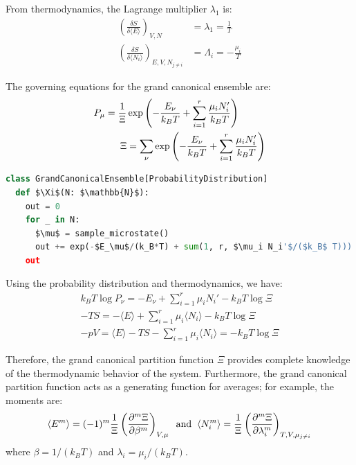 \documentclass[book.tex]{subfiles}
\begin{document}
From thermodynamics, the Lagrange multiplier $\lambda_1$ is:
\begin{align}
\left( \frac{\delta S}{\delta \langle E \rangle} \right)_{V,N} &= \lambda_1 = \frac{1}{T} \\ 
\left( \frac{\delta S}{\delta \langle N_i \rangle} \right)_{E,V,N_{j\neq i}} &= \Lambda_i = - \frac{\mu_i}{T} 
\end{align}

The governing equations for the grand canonical ensemble are:
\begin{align}
P_\mu = \frac{1}{\Xi}&\exp\left(-\frac{E_\nu}{k_BT}+ \sum_{i=1}^r\frac{\mu_iN_i'}{k_BT} \right) \hspace{0.5cm} \\ 
\Xi &= \sum_\nu \exp\left(-\frac{E_\nu}{k_BT}+ \sum_{i=1}^r\frac{\mu_iN_i'}{k_BT}\right) 
\end{align}

\begin{lstlisting}[language=python]
class GrandCanonicalEnsemble[ProbabilityDistribution]
  def $\Xi$(N: $\mathbb{N}$):
    out = 0
    for _ in N:
      $\mu$ = sample_microstate()
      out += exp(-$E_\mu$/(k_B*T) + sum(1, r, $\mu_i N_i'$/($k_B$ T)))
    out
\end{lstlisting}

Using the probability distribution and thermodynamics, we have:
\begin{eqnarray}
k_BT\log P_\nu = -E_\nu + \sum_{i=1}^r\mu_iN_i' -k_BT\log\Xi \\
-TS =-\langle E \rangle + \sum_{i=1}^r\mu_i \langle N_i \rangle -k_BT\log\Xi \\
-pV = \langle E \rangle -TS - \sum_{i=1}^r \mu_i \langle N_i \rangle = -k_BT\log\Xi 
\end{eqnarray}

Therefore, the grand canonical partition function $\Xi$ provides complete knowledge of the thermodynamic behavior of the system. Furthermore, the grand canonical partition function acts as a generating function for averages; for example, the moments are:
\begin{align}
\langle E^m \rangle = (-1)^m\frac{1}{\Xi} \left(\frac{\partial^m \Xi}{\partial \beta^m}\right)_{V,\mu} \hspace{0.2cm} \text{and} \hspace{0.2cm} \langle N_i^m \rangle = \frac{1}{\Xi} \left(\frac{\partial^m \Xi}{\partial \lambda_i^m}\right)_{T,V,\mu_{j\neq i}} 
\end{align}
\noindent where $\beta= 1/(k_BT)$ and $\lambda_i = \mu_i/(k_BT)$.
\end{document}
